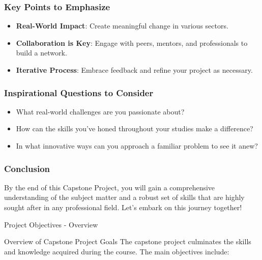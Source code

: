 \documentclass[aspectratio=169]{beamer}
\begin{document}
\begin{frame}[fragile]
    \frametitle{Key Points to Emphasize}
    \begin{itemize}
        \item \textbf{Real-World Impact}: Create meaningful change in various sectors.
        \item \textbf{Collaboration is Key}: Engage with peers, mentors, and professionals to build a network.
        \item \textbf{Iterative Process}: Embrace feedback and refine your project as necessary.
    \end{itemize}
\end{frame}

\begin{frame}[fragile]
    \frametitle{Inspirational Questions to Consider}
    \begin{itemize}
        \item What real-world challenges are you passionate about?
        \item How can the skills you’ve honed throughout your studies make a difference?
        \item In what innovative ways can you approach a familiar problem to see it anew?
    \end{itemize}
\end{frame}

\begin{frame}[fragile]
    \frametitle{Conclusion}
    By the end of this Capstone Project, you will gain a comprehensive understanding of the subject matter and a robust set of skills that are highly sought after in any professional field. Let's embark on this journey together!
\end{frame}

\begin{frame}[fragile]{Project Objectives - Overview}
    \begin{block}{Overview of Capstone Project Goals}
        The capstone project culminates the skills and knowledge acquired during the course. 
        The main objectives include:
    \end{block}
\end{frame}
\end{document}
